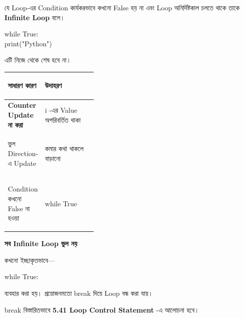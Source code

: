 

যে Loop-এর Condition কার্যকরভাবে কখনো
\textenglish{\ttfamily False}
হয় না এবং Loop অনির্দিষ্টকাল চলতে থাকে তাকে
\textbf{Infinite Loop} বলে।

\begin{codebox}
\begin{english}
\ttfamily
while True:\\
\hspace*{4mm}print("Python")
\end{english}
\end{codebox}

এটি নিজে থেকে শেষ হবে না।

\begin{tabularx}
{\linewidth}
{
|>{\bfseries\RaggedRight\arraybackslash}p{0.36\linewidth}
|Y|
}

\hline
{}

\textbf{সাধারণ কারণ}
&
\textbf{উদাহরণ}
\\
\hline

Counter Update না করা
&
\textenglish{\ttfamily i}
-এর Value অপরিবর্তিত থাকা
\\
\hline

ভুল Direction-এ Update
&
কমার কথা থাকলে বাড়ানো
\\
\hline

Condition কখনো False না হওয়া
&
\textenglish{\ttfamily while True}
\\
\hline

\end{tabularx}


\begin{rememberbox}

\textbf{\color{deepOrange}সব Infinite Loop ভুল নয়}

কখনো ইচ্ছাকৃতভাবে—

\begin{center}
\textenglish{\ttfamily while True:}
\end{center}

ব্যবহার করা হয়। প্রয়োজনমতো
\textenglish{\ttfamily break}
দিয়ে Loop বন্ধ করা যায়।

\textenglish{\ttfamily break}
বিস্তারিতভাবে
\textbf{5.41 Loop Control Statement}
-এ আলোচনা হবে।

\end{rememberbox}

